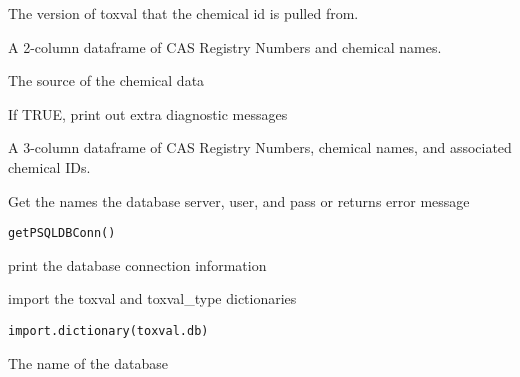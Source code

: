 \documentclass[letterpaper]{book}
\begin{document}
%
\begin{Arguments}
\begin{ldescription}
\item[\code{toxval.db}] The version of toxval that the chemical id is pulled from.

\item[\code{chemical.list}] A 2-column dataframe of CAS Registry Numbers and chemical names.

\item[\code{source}] The source of the chemical data

\item[\code{verbose}] If TRUE, print out extra diagnostic messages
\end{ldescription}
\end{Arguments}
%
\begin{Value}
A 3-column dataframe of CAS Registry Numbers, chemical names, and associated chemical IDs.
\end{Value}
%
\begin{Description}\relax
Get the names the database server, user, and pass or returns error message
\end{Description}
%
\begin{Usage}
\begin{verbatim}
getPSQLDBConn()
\end{verbatim}
\end{Usage}
%
\begin{Value}
print the database connection information
\end{Value}
%
\begin{Description}\relax
import the toxval and toxval\_type dictionaries
\end{Description}
%
\begin{Usage}
\begin{verbatim}
import.dictionary(toxval.db)
\end{verbatim}
\end{Usage}
%
\begin{Arguments}
\begin{ldescription}
\item[\code{toxval.db}] The name of the database
\end{ldescription}
\end{Arguments}
\end{document}
